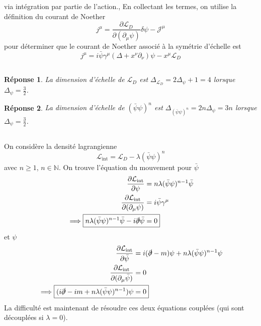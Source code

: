 \documentclass{article}
\numberwithin{equation}{section}
\theoremstyle{solution}
\newtheorem{solution}{Réponse}[section]
\begin{document}
via intégration par partie de l'action., En collectant les termes, on utilise la définition du courant de Noether
\begin{equation}
        j^{\mu} = \frac{\partial \mathcal{L}_D}{\partial (\partial_\mu \psi)} \delta \psi - \mathcal{J}^{\mu} 
\end{equation} 
pour déterminer que le courant de Noether associé à la symétrie d'échelle est
\begin{equation}
        \boxed{j^{\mu} = i\bar{\psi}\gamma^{\mu}(\Delta + x^{\nu}\partial_\nu) \psi - x^{\mu}\mathcal{L}_D }
\end{equation} 


\subsection{}
\begin{solution}
La dimension d'échelle de $\mathcal{L}_D$ est $\Delta_{\mathcal{L}_D} = 2\Delta_{\psi} + 1 = 4$ lorsque 
$\Delta_{\psi} = \frac{3}{2}$.
\end{solution}
\begin{solution}
La dimension d'échelle de $(\bar{\psi}\psi)^{n}$ est $\Delta_{(\bar{\psi}\psi)^{n}} = 2n\Delta_{\psi} = 3n$ lorsque 
$\Delta_{\psi} = \frac{3}{2}$.
\end{solution}

\subsection{}
On considère la densité lagrangienne 
\begin{equation}
        \mathcal{L}_{\mathrm{int}} = \mathcal{L}_D - \lambda(\bar{ \psi} \psi)^{n}
\end{equation} 
avec $n \geq 1$, $n \in \mathbb{N}$. 
On trouve l'équation du mouvement pour $\bar{\psi}$
\begin{align*}
        \frac{\partial \mathcal{L}_{\mathrm{int}}}{\partial \psi} &= n\lambda(\bar{\psi} \psi)^{n-1}\bar{\psi} \\
        \frac{\partial \mathcal{L}_{\mathrm{int}}}{\partial (\partial_\mu \psi)} &= i \bar{\psi}\gamma^{\mu} \\
        \implies \Aboxed{n\lambda(\bar{ \psi}\psi)^{n-1}\bar{\psi} - i\slashed{\partial} \bar{\psi} &=  0}
\end{align*}
et $\psi$
\begin{align*}
       \frac{\partial \mathcal{L}_{\mathrm{int}}}{\partial \bar{\psi}} &= i(\slashed{\partial} - m)\psi +   n\lambda(\bar{\psi}\psi)^{n-1}\psi \\
       \frac{\partial \mathcal{L}_{\mathrm{int}}}{\partial (\partial_\mu \bar{\psi})} &= 0 \\
       \implies \Aboxed{(i\slashed{\partial} - im + n\lambda(\bar{\psi}\psi)^{n-1})\psi &=  0}
\end{align*}
La difficulté est maintenant de résoudre ces deux équations couplées (qui sont découplées si $\lambda = 0$).
\end{document}
